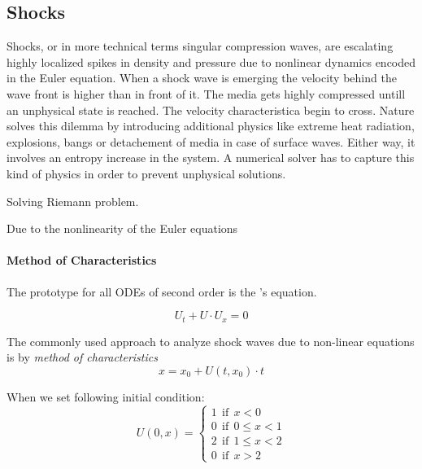 \subsection{Shocks}

Shocks, or in more technical terms singular compression waves, are escalating
highly localized spikes in density and pressure due to nonlinear dynamics
encoded in the Euler equation. When a shock wave is emerging the velocity
behind the wave front is higher than in front of it. The media gets highly
compressed untill an unphysical state is reached. The velocity characteristica
begin to cross. Nature solves this dilemma by introducing additional physics
like extreme heat radiation, explosions, bangs or detachement of media in case
of surface waves. Either way, it involves an entropy increase in the system.
A numerical solver has to capture this kind of physics in order to prevent
unphysical solutions.

Solving Riemann problem.

Due to the nonlinearity of the Euler equations 

\paragraph{Method of Characteristics}

The prototype for all ODEs of second order is the 's equation.

\begin{equation}
    U_t + U \cdot U_x = 0
\end{equation}

The commonly used approach to analyze shock waves due to non-linear equations
is by \emph{method of characteristics}
\begin{equation}
    x = x_0 + U(t,x_0) \cdot t
\end{equation}

When we set following initial condition:
\begin{equation}
    U(0,x) = 
    \begin{cases}
        1 \ \ \text{if} \ \ x < 0 \\
        0 \ \ \text{if} \ \ 0 \leq x < 1 \\
        2 \ \ \text{if} \ \ 1 \leq x < 2 \\
        0 \ \ \text{if} \ \ x > 2    
    \end{cases}
\end{equation}



